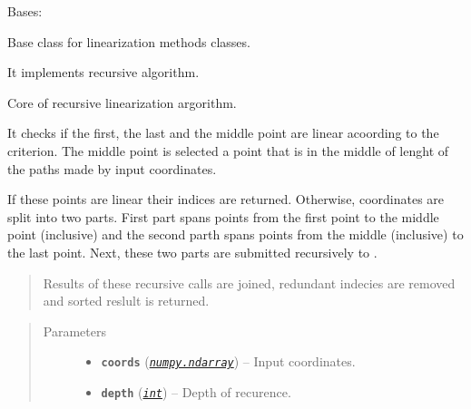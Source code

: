 \documentclass[a4paper,10pt,english]{sphinxmanual}
\begin{document}

\begin{fulllineitems}
\label{aqueduct.geom.traces:aqueduct.geom.traces.LinearizeRecursive}
Bases: \href{https://docs.python.org/2/library/functions.html\#object}{}

Base class for linearization methods classes.

It implements recursive algorithm.

\begin{fulllineitems}
\label{aqueduct.geom.traces:aqueduct.geom.traces.LinearizeRecursive.here}
Core of recursive linearization argorithm.

It checks if the first, the last and the middle point are linear acoording to the criterion. The middle point is selected a point that is in the middle of lenght of the paths made by input coordinates.

If these points are linear their indices are returned. Otherwise, coordinates are split into two parts. First part spans points from the first point to the middle point (inclusive) and the second parth spans points from the middle (inclusive) to the last point. Next, these two parts are submitted recursively to {\hyperref[aqueduct.geom.traces:aqueduct.geom.traces.LinearizeRecursive.here]{}}.
\begin{quote}

Results of these recursive calls are joined, redundant indecies are removed and sorted reslult is returned.
\end{quote}
\begin{quote}\begin{description}
\item[{Parameters}] \leavevmode\begin{itemize}
\item {} 
\textbf{\texttt{coords}} (\href{http://docs.scipy.org/doc/numpy/reference/generated/numpy.ndarray.html\#numpy.ndarray}{\emph{\texttt{numpy.ndarray}}}) -- Input coordinates.

\item {} 
\textbf{\texttt{depth}} (\href{https://docs.python.org/2/library/functions.html\#int}{\emph{\texttt{int}}}) -- Depth of recurence.


\end{itemize}
\end{description}
\end{quote}
\end{fulllineitems}
\end{fulllineitems}
\end{document}
